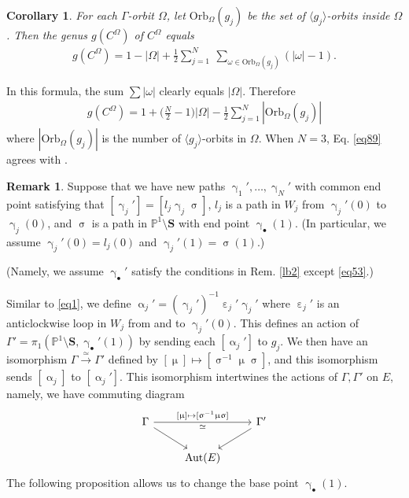 \documentclass[11pt,b5paper,notitlepage]{article}
\theoremstyle{definition}
\newtheorem{rem}[df]{Remark}
\theoremstyle{plain}
\newtheorem{co}[df]{Corollary}
\newcommand{\bk}[1]{\langle {#1}\rangle}
\newcommand{\blt}{\bullet}
\newcommand{\Pbb}{\mathbb P}
\newcommand{\Sbf}{\mathbf{S}}
\newcommand{\Orb}{\mathrm{Orb}}
\numberwithin{equation}{subsection}
\begin{document}
\begin{co}
For each $\Gamma$-orbit $\Omega$, let $\Orb_\Omega(g_j)$ be the set of $\bk{g_j}$-orbits inside $\Omega$. Then  the genus $g(C^\Omega)$ of $C^\Omega$ equals
\begin{align}\label{eq88}
g(C^\Omega)=1-|\Omega|+\frac 12\sum_{j=1}^N~\sum_{\omega\in\Orb_\Omega(g_j)}(|\omega|-1).
\end{align}
\end{co}

In this formula, the sum $\sum|\omega|$ clearly equals $|\Omega|$. Therefore
\begin{align}
	g(C^\Omega)=1+\Big(\frac N2-1\Big)|\Omega|-\frac 12\sum_{j=1}^N|\Orb_\Omega(g_j)|\label{eq89}
\end{align}
where $|\Orb_\Omega(g_j)|$ is the number of $\bk{g_j}$-orbits in $\Omega$. When $N=3$, Eq. \eqref{eq89} agrees with \cite[Lemma 8]{BS11}.



\begin{rem}\label{lb25}
Suppose that we have new paths $\upgamma_1',\dots,\upgamma_N'$ with common end point  satisfying that  $[\upgamma_j']=[l_j\upgamma_j\upsigma]$, $l_j$ is a path in $W_j$ from $\upgamma_j'(0)$ to $\upgamma_j(0)$, and $\upsigma$ is a path in $\Pbb^1\setminus\Sbf$ with end point $\upgamma_\blt(1)$. (In particular, we assume $\upgamma_j'(0)=l_j(0)$ and $\upgamma_j'(1)=\upsigma(1)$.) 
	
(Namely, we assume $\upgamma_\blt'$ satisfy the conditions in Rem. \ref{lb2} except \eqref{eq53}.)
	
Similar to \eqref{eq1}, we define $\upalpha_j'=(\upgamma_j')^{-1}\upepsilon_j'\upgamma_j'$ where $\upepsilon_j'$ is an anticlockwise loop in $W_j$ from and to $\upgamma_j'(0)$. This defines an action of $\Gamma'=\pi_1(\Pbb^1\setminus\Sbf,\upgamma_\blt'(1))$ by sending each $[\upalpha_j']$ to $g_j$. We then have an isomorphism $\Gamma\xrightarrow{\simeq}\Gamma'$ defined by $[\upmu]\mapsto[\upsigma^{-1}\upmu\upsigma]$, and this isomorphism sends $[\upalpha_j]$ to $[\upalpha_j']$. This isomorphism intertwines the actions of $\Gamma,\Gamma'$ on $E$, namely, we have commuting diagram
\begin{equation}\label{eq69}
\begin{tikzcd}
\Gamma\arrow[rr, "\simeq"',"{[\upmu]\mapsto [\upsigma^{-1}\upmu\upsigma]}"] \arrow[dr] && \Gamma'\arrow[dl]\\
&\mathrm{Aut}(E)
\end{tikzcd}	
\end{equation}
The following proposition allows us to change  the base point $\upgamma_\blt(1)$.
\end{rem}
\end{document}
